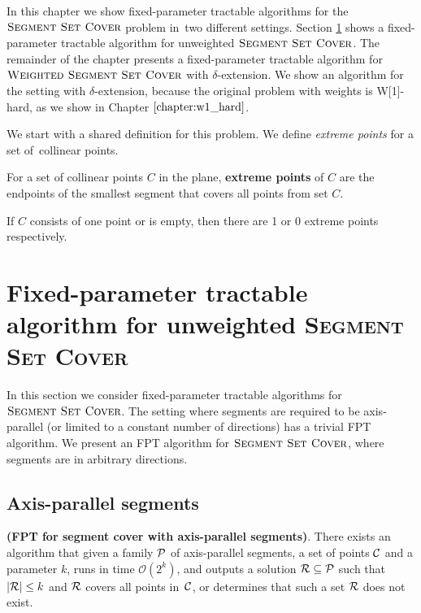 In this chapter we show fixed-parameter tractable algorithms
for the $\textsc{Segment Set Cover}$ problem in~two different settings.
Section \ref{section:fpt_unweighted} shows 
a fixed-parameter tractable algorithm for unweighted $\textsc{Segment Set Cover}$.
The remainder of the chapter presents
a fixed-parameter tractable algorithm for $\textsc{Weighted Segment Set Cover}$
with $\delta$-extension.
We show an algorithm for the setting with $\delta$-extension,
because the original problem with weights is W[1]-hard,
as we show in Chapter $\ref{chapter:w1_hard}$.

We start with a shared definition for this problem.
We define \textit{extreme points} for a set of~collinear points.

\begin{defi}
	For a set of collinear points $C$ in the plane,
	\textbf{extreme points} of $C$ are the endpoints
	of the smallest segment that covers all points from set $C$.
	
	If $C$ consists of one point or is empty, then
	there are 1 or 0 extreme points respectively.
\end{defi}

\section{Fixed-parameter tractable algorithm for
unweighted \textsc{Segment} \textsc{Set} \textsc{Cover}}
\label{section:fpt_unweighted}
In this section we consider fixed-parameter tractable
algorithms for $\textsc{Segment Set Cover}$.
The setting where segments are required to be axis-parallel
(or limited to a constant number of directions) has a trivial FPT algorithm.
We present an FPT algorithm for $\textsc{Segment Set Cover}$,
where segments are in arbitrary directions.

\subsection{Axis-parallel segments}
\begin{tw}
	\textbf{(FPT for segment cover with axis-parallel segments)}.
	There exists an algorithm that given a family $\mathcal{P}$ of
	axis-parallel segments,
	a set of points $\mathcal{C}$
	and a parameter $k$,
	runs in time $\mathcal{O}(2^k)$,
	and outputs a solution $\mathcal{R} \subseteq \mathcal{P}$
	such that $|\mathcal{R}| \le k$ and $\mathcal{R}$ covers all points in~$\mathcal{C}$,
	or determines that such a set $\mathcal{R}$ does not exist.
\end{tw}

